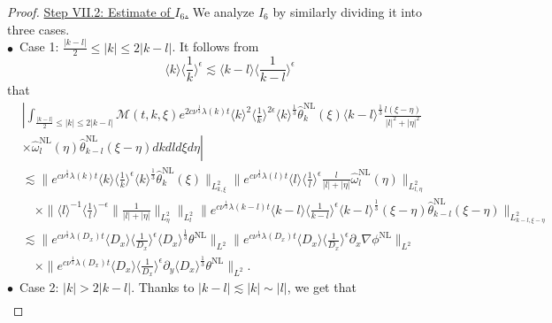 \documentclass[reqno, 12pt]{amsart} %
\theoremstyle{plain} %
\theoremstyle{definition}
\theoremstyle{remark}
\numberwithin{equation}{section} %
\newcommand{\no}{\nonumber}
\newcommand{\lt}{\left}
\newcommand{\rt}{\right}
\newcommand{\px}{\partial_x}
\newcommand{\py}{\partial_y}
\begin{document}
\begin{proof}
		\underline{ Step VII.2: Estimate of $ I_6$.}  
		We analyze $I_6$ by similarly dividing it into three cases.\\
		$\bullet$~Case 1:  $\frac{|k-l|}{2} \leq |k| \leq 2|k-l|$. It follows from 
		\begin{equation} \label{eq:trick9}
			\langle k \rangle \langle \frac1k \rangle^\epsilon\lesssim \langle k-l \rangle\langle \frac1{k-l}\rangle^\epsilon
		\end{equation}
		that
		\begin{align} \label{eq:temp36}
			& \no\left| \int_{\frac{|k-l|}{2} \leq |k| \leq 2|k-l|} \mathcal{M}(t, k, \xi) e^{2 c \nu^{\frac{1}{3}} \lambda(k) t}\langle k\rangle^2\langle\frac{1}{k}\rangle^{2 \epsilon} \langle k \rangle^\frac13\hat{\theta}_k^{\mathrm{NL}}(\xi) \langle k-l \rangle^\frac13  \frac{l(\xi - \eta)}{|l|^2+|\eta|^2}\right. \\
			&\lt. \no \times \hat{\omega}_l^{\mathrm{NL}}(\eta) \hat{\theta}_{k-l}^{\mathrm{NL}}(\xi-\eta) d k d l d \xi d \eta \rt| \\
			& \no\lesssim\|e^{c \nu^{\frac{1}{3}} \lambda(k) t}  \langle k \rangle \langle \frac1k \rangle^\epsilon \langle k \rangle^\frac13  \hat{\theta}_k^{\mathrm{NL}}(\xi)\|_{L_{k, \xi}^2}   \|e^{c \nu^{\frac{1}{3}} \lambda(l) t}\langle l\rangle\langle\frac{1}{l}\rangle^\epsilon \frac l{|l| + |\eta|} \hat{\omega}_l^{\mathrm{NL}}(\eta)\|_{L_{l, \eta}^2}     \\
			&\no \quad \times \|\langle l\rangle^{-1}\langle\frac{1}{l}\rangle^{-\epsilon}\| \frac{1}{|l|+|\eta|}\|_{L_\eta^2}\|_{L_l^2} \|e^{c \nu^{\frac{1}{3}} \lambda(k-l) t}\langle k-l \rangle \langle \frac{1}{k-l} \rangle^\epsilon \langle k-l \rangle ^ \frac13 (\xi - \eta) \hat{\theta}_{k-l}^{\mathrm{NL}}(\xi-\eta)\|_{L_{k-l, \xi-\eta}^2} \\
			&\no \lesssim\|e^{c \nu^{\frac{1}{3}} \lambda\left(D_x\right) t}\langle D_x\rangle    \langle \frac{1}{D_x}\rangle^\epsilon  \langle D_x \rangle^{\frac{1}{3}} \theta^{\mathrm{NL}}\|_{L^2} \|e^{c \nu^{\frac{1}{3}} \lambda\left(D_x\right) t}\langle D_x\rangle\langle\frac{1}{D_x}\rangle^\epsilon\px \nabla \phi^{\mathrm{NL}}\|_{L^2} \\
			& \quad \times\|e^{c \nu^{\frac{1}{3}} \lambda\left(D_x\right) t}\langle D_x\rangle\langle\frac{1}{D_x}\rangle^\epsilon \py \langle D_x \rangle^{\frac{1}{3}} \theta^{\mathrm{NL}}\|_{L^2}.
		\end{align}
		$\bullet$~Case 2:   $|k| > 2|k-l| $. Thanks to $|k-l|\lesssim |k| \sim |l|$,  we get that
		\begin{align} \label{eq:temp37}

\end{align}
\end{proof}
\end{document}

